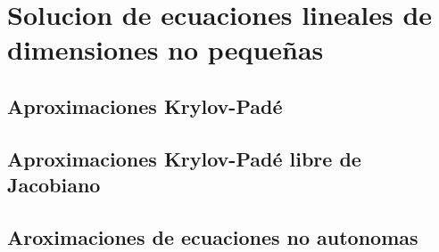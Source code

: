 \chapter{Solucion de ecuaciones lineales de dimensiones no pequeñas}\label{chapter:solve-non-smal-lineal-eq}

\section{Aproximaciones Krylov-Padé}


\section{Aproximaciones Krylov-Padé libre de Jacobiano}


\section{Aroximaciones de ecuaciones no autonomas}
